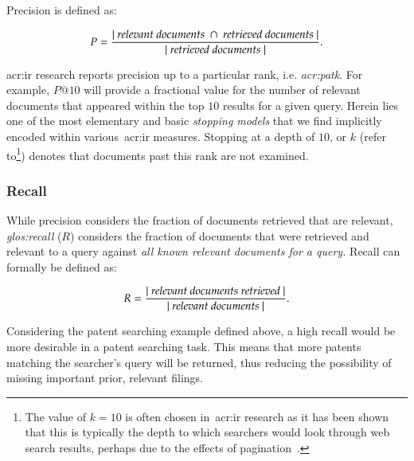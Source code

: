 Precision is defined as:

\begin{equation}
P = \frac{|~\text{\emph{relevant documents}}~\cap~\text{\emph{retrieved documents}}~|}{|~\text{\emph{retrieved documents}}~|}.
\end{equation}

\gls{acr:ir} research reports precision up to a particular rank, i.e. \emph{\gls{acr:patk}}. For example, $P@10$ will provide a fractional value for the number of relevant documents that appeared within the top $10$ results for a given query. Herein lies one of the most elementary and basic \emph{stopping models} that we find implicitly encoded within various~\gls{acr:ir} measures. Stopping at a depth of $10$, or $k$ (refer to\footnote{The value of $k=10$ is often chosen in~\gls{acr:ir} research as it has been shown that this is typically the depth to which searchers would look through web search results, perhaps due to the effects of pagination~\citep{jansen2006www}.}) denotes that documents past this rank are not examined.

\subsubsection{Recall}\label{sec:ir_background:evaluation:system:recall}
While precision considers the fraction of documents retrieved that are relevant, \emph{\gls{glos:recall}} ($R$) considers the fraction of documents that were retrieved and relevant to a query against \emph{all known relevant documents for a query.} Recall can formally be defined as:

\begin{equation}
R = \frac{|~\text{\emph{relevant documents retrieved}}~|}{|~\text{\emph{relevant documents}}~|}.
\end{equation}

Considering the patent searching example defined above, a high recall would be more desirable in a patent searching task. This means that more patents matching the searcher's query will be returned, thus reducing the possibility of missing important prior, relevant filings.

